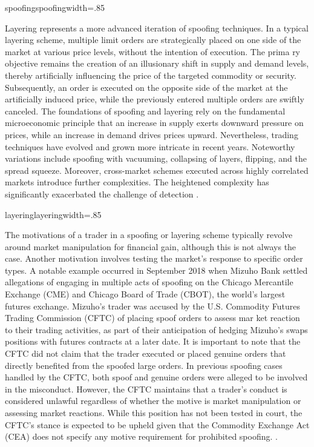 {spoofing}{spoofing}{width=.85\textwidth}%

Layering represents a more advanced iteration of spoofing techniques. In a typical layering scheme, multiple limit orders
are strategically placed on one side of the market at various price levels, without the intention of execution. The prima
ry objective remains the creation of an illusionary shift in supply and demand levels, thereby artificially influencing
the price of the targeted commodity or security. Subsequently, an order is executed on the opposite side of the market
at the artificially induced price, while the previously entered multiple orders are swiftly canceled. The foundations of
spoofing and layering rely on the fundamental microeconomic principle that an increase in supply exerts downward pressure
on prices, while an increase in demand drives prices upward. Nevertheless, trading techniques have evolved and grown more
intricate in recent years. Noteworthy variations include spoofing with vacuuming, collapsing of layers, flipping, and the
spread squeeze. Moreover, cross-market schemes executed across highly correlated markets introduce further complexities.
The heightened complexity has significantly exacerbated the challenge of detection \cite{corcoran2020understanding,
cheung2019understanding}.

{layering}{layering}{width=.85\textwidth}%

The motivations of a trader in a spoofing or layering scheme typically revolve around market manipulation for financial
gain, although this is not always the case. Another motivation involves testing the market's response to specific order
types. A notable example occurred in September 2018 when Mizuho Bank settled allegations of engaging in multiple acts of
spoofing on the Chicago Mercantile Exchange (CME) and Chicago Board of Trade (CBOT), the world's largest futures exchange.
Mizuho's trader was accused by the U.S. Commodity Futures Trading Commission (CFTC) of placing spoof orders to assess mar
ket reaction to their trading activities, as part of their anticipation of hedging Mizuho's swaps positions with futures
contracts at a later date. It is important to note that the CFTC did not claim that the trader executed or placed genuine
orders that directly benefited from the spoofed large orders. In previous spoofing cases handled by the CFTC, both spoof
and genuine orders were alleged to be involved in the misconduct. However, the CFTC maintains that a trader's conduct is
considered unlawful regardless of whether the motive is market manipulation or assessing market reactions. While this
position has not been tested in court, the CFTC's stance is expected to be upheld given that the Commodity Exchange Act
(CEA) does not specify any motive requirement for prohibited spoofing. \cite{cftc2018mizuho, lu2021individual,
schultz2019spoofing}.

